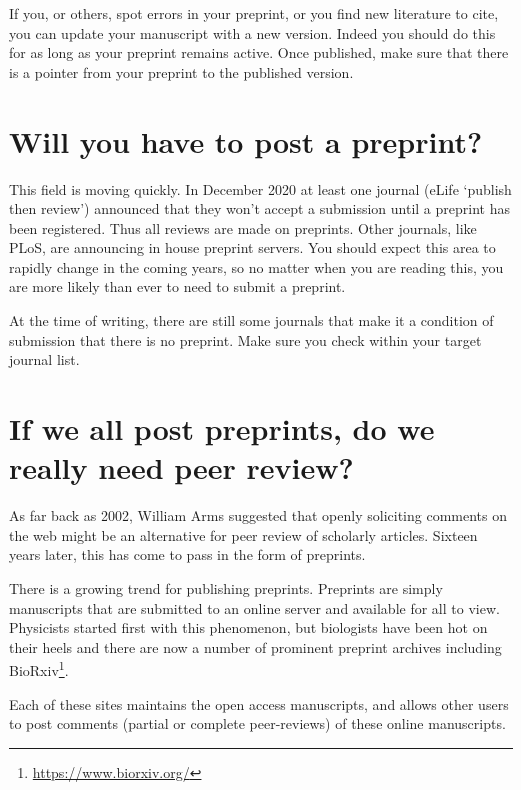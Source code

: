 \documentclass[
]{krantz}
\renewcommand{\href}[2]{#2\footnote{\url{#1}}}
\begin{document}
If you, or others, spot errors in your preprint, or you find new literature to cite, you can update your manuscript with a new version. Indeed you should do this for as long as your preprint remains active. Once published, make sure that there is a pointer from your preprint to the published version.

\hypertarget{will-you-have-to-post-a-preprint}{%
\section{Will you have to post a preprint?}\label{will-you-have-to-post-a-preprint}}

This field is moving quickly. In December 2020 at least one journal (eLife `publish then review') announced that they won't accept a submission until a preprint has been registered. Thus all reviews are made on preprints. Other journals, like PLoS, are announcing in house preprint servers. You should expect this area to rapidly change in the coming years, so no matter when you are reading this, you are more likely than ever to need to submit a preprint.

At the time of writing, there are still some journals that make it a condition of submission that there is no preprint. Make sure you check within your target journal list.

\hypertarget{if-we-all-post-preprints-do-we-really-need-peer-review}{%
\section{If we all post preprints, do we really need peer review?}\label{if-we-all-post-preprints-do-we-really-need-peer-review}}

As far back as 2002, William Arms \citep{arms2002what} suggested that openly soliciting comments on the web might be an alternative for peer review of scholarly articles. Sixteen years later, this has come to pass in the form of preprints.

There is a growing trend for publishing preprints. Preprints are simply manuscripts that are submitted to an online server and available for all to view. Physicists started first with this phenomenon, but biologists have been hot on their heels and there are now a number of prominent preprint archives including \href{https://www.biorxiv.org/}{BioRxiv}.

Each of these sites maintains the open access manuscripts, and allows other users to post comments (partial or complete peer-reviews) of these online manuscripts.
\end{document}
